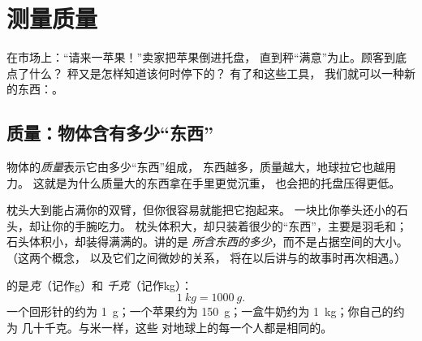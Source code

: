 \chapter{测量质量}\label{ch:g3:measuring-mass}

在市场上：“请来一苹果！”卖家把苹果倒进托盘，
直到秤“满意”为止。顾客到底点了什么？
秤又是怎样知道该何时停下的？
有了和这些工具，
我们就可以一种新的东西：。

\section{质量：物体含有多少“东西”}

\begin{definition}[质量]\label{def:g3:measuring-mass:mass}
物体的\emph{质量}表示它由多少“东西”组成，
东西越多，质量越大，地球拉它也越用力。
这就是为什么质量大的东西拿在手里更觉沉重，
也会把的托盘压得更低。
\end{definition}

\begin{example}[大不等于重]\label{ex:g3:measuring-mass:bignotcheavy}
枕头大到能占满你的双臂，但你很容易就能把它抱起来。
一块比你拳头还小的石头，却让你的手腕吃力。
枕头体积大，却只装着很少的“东西”，主要是羽毛和；
石头体积小，却装得满满的。讲的是
\emph{所含东西的多少}，而不是占据空间的大小。（这两个概念，
以及它们之间微妙的关系，
将在以后讲与的故事时再次相遇。）
\end{example}

\begin{definition}[克与千克]\label{def:g3:measuring-mass:units}
的是\emph{克}（记作\unit{g}）和
\emph{千克}（记作\unit{kg}）：
\[
\qty{1}{kg} = \qty{1000}{g}.
\]
一个回形针的约为 \qty{1}{g}；一个苹果约为
\qty{150}{g}；一盒牛奶约为 \qty{1}{kg}；你自己的约为
几十千克。与米一样，这些
对地球上的每一个人都是相同的。
\end{definition}

